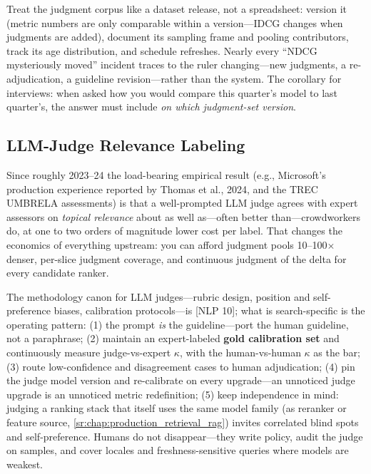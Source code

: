 \begin{keyinsight}
Treat the judgment corpus like a dataset release, not a spreadsheet: version it (metric numbers are only comparable within a version---IDCG changes when judgments are added), document its sampling frame and pooling contributors, track its age distribution, and schedule refreshes. Nearly every ``NDCG mysteriously moved'' incident traces to the ruler changing---new judgments, a re-adjudication, a guideline revision---rather than the system. The corollary for interviews: when asked how you would compare this quarter's model to last quarter's, the answer must include \textit{on which judgment-set version}.
\end{keyinsight}

\subsection{LLM-Judge Relevance Labeling}

Since roughly 2023--24 the load-bearing empirical result (e.g., Microsoft's production experience reported by Thomas et al., 2024, and the TREC UMBRELA assessments) is that a well-prompted LLM judge agrees with expert assessors on \textit{topical relevance} about as well as---often better than---crowdworkers do, at one to two orders of magnitude lower cost per label. That changes the economics of everything upstream: you can afford judgment pools 10--100$\times$ denser, per-slice judgment coverage, and continuous judgment of the delta for every candidate ranker.

The methodology canon for LLM judges---rubric design, position and self-preference biases, calibration protocols---is [NLP 10]; what is search-specific is the operating pattern: (1) the prompt \textit{is} the guideline---port the human guideline, not a paraphrase; (2) maintain an expert-labeled \textbf{gold calibration set} and continuously measure judge-vs-expert $\kappa$, with the human-vs-human $\kappa$ as the bar; (3) route low-confidence and disagreement cases to human adjudication; (4) pin the judge model version and re-calibrate on every upgrade---an unnoticed judge upgrade is an unnoticed metric redefinition; (5) keep independence in mind: judging a ranking stack that itself uses the same model family (as reranker or feature source, \ref{sr:chap:production_retrieval_rag}) invites correlated blind spots and self-preference. Humans do not disappear---they write policy, audit the judge on samples, and cover locales and freshness-sensitive queries where models are weakest.

